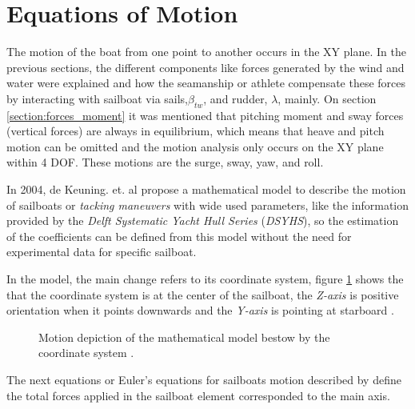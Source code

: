 \section{Equations of Motion} \label{sec:eq_of_motion}
The motion of the boat from one point to another occurs in the XY plane. In the previous sections, the different components like forces generated by the wind and water were explained and how the seamanship or athlete compensate these forces by interacting with sailboat via sails,$\beta_{tw}$, and rudder, $\lambda$, mainly. On section \ref{section:forces_moment} 
it was mentioned that pitching moment and sway forces (vertical forces) are always in equilibrium, which means that heave and  pitch  motion can be omitted and the motion analysis only occurs on the XY plane within 4 DOF. These motions are the surge, sway, yaw, and roll.\par 

In 2004, de Keuning. et. al \cite{keuning2004mathematical} propose a mathematical model to describe the motion of sailboats or \textit{tacking maneuvers} with wide used parameters, like the information provided by the \textit{Delft Systematic Yacht Hull Series} (\textit{DSYHS}), so the estimation of the coefficients can be defined from this model without the need for experimental data for specific sailboat. \par 


In the model, the main change refers to its coordinate system, figure \ref{fig:csys_tackmodel} shows the that the coordinate system is at the center of the sailboat, the \textit{Z-axis} is positive orientation when it points downwards and the \textit{Y-axis} is pointing at starboard \cite{keuning2004mathematical}. \par

\begin{figure} %
  \centering
  \hfill
  \caption{Motion depiction of the mathematical model bestow by the coordinate system \cite{keuning2004mathematical}.}
\label{fig:csys_tackmodel} 
\end{figure}

The next equations or Euler's equations for sailboats motion described by \cite{keuning2004mathematical} define the total forces applied in the sailboat element corresponded to the main axis.\par

